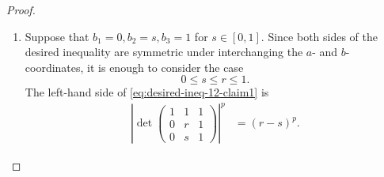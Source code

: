 \documentclass[11pt,a4paper]{amsart}
\theoremstyle{plain}
\theoremstyle{definition}
\begin{document}
\begin{proof}
    \begin{enumerate}[wide =0pt, labelwidth= 1.1cm]
        \item[\bf Case 1:] Suppose that $b_1 = 0, b_2 = s, b_3 =1 $ for $ s \in [0,1]$.
        Since both sides of the desired inequality are symmetric under interchanging the $a$- and $b$-coordinates, it is enough to consider the case
        $$
        0 \leq s \leq r \leq 1 .
        $$
        The left-hand side of \eqref{eq:desired-ineq-12-claim1} is
        \begin{align}
            \left|\operatorname{det}\left(\begin{array}{ccc}1 & 1 & 1 \\ 0 & r & 1 \\ 0 & s & 1\end{array}\right)\right|^p   
            &= (r-s)^p.
        \end{align}
        

\end{enumerate}
\end{proof}
\end{document}
